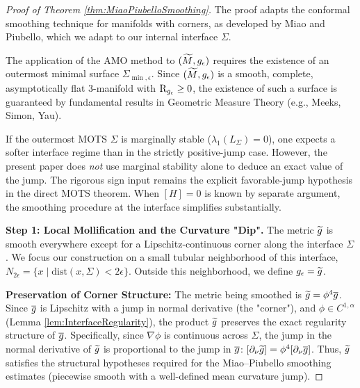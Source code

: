 \begin{proof}[Proof of Theorem \ref{thm:MiaoPiubelloSmoothing}]
The proof adapts the conformal smoothing technique for manifolds with corners, as developed by Miao and Piubello, which we adapt to our internal interface $\Sigma$.

\begin{remark}
The application of the AMO method to $(\widetilde{M}, g_{\epsilon})$ requires the existence of an outermost minimal surface $\Sigma_{\min, \epsilon}$. Since $(\widetilde{M}, g_{\epsilon})$ is a smooth, complete, asymptotically flat 3-manifold with $\mathrm{R}_{g_{\epsilon}}\ge 0$, the existence of such a surface is guaranteed by fundamental results in Geometric Measure Theory (e.g., Meeks, Simon, Yau).
\end{remark}

\begin{remark}
If the outermost MOTS $\Sigma$ is marginally stable ($\lambda_1(L_\Sigma)=0$), one expects a softer interface regime than in the strictly positive-jump case. However, the present paper does \emph{not} use marginal stability alone to deduce an exact value of the jump. The rigorous sign input remains the explicit favorable-jump hypothesis in the direct MOTS theorem. When $[H]=0$ is known by separate argument, the smoothing procedure at the interface simplifies substantially.
\end{remark}

\textbf{Step 1: Local Mollification and the Curvature "Dip".}
The metric $\widetilde{g}$ is smooth everywhere except for a Lipschitz-continuous corner along the interface $\Sigma$. We focus our construction on a small tubular neighborhood of this interface, $N_{2\epsilon} = \{x \mid \text{dist}(x, \Sigma) < 2\epsilon\}$. Outside this neighborhood, we define $g_{\epsilon} = \widetilde{g}$.

\textbf{Preservation of Corner Structure:}
The metric being smoothed is $\widetilde{g} = \phi^4 \overline{g}$. Since $\overline{g}$ is Lipschitz with a jump in normal derivative (the "corner"), and $\phi \in C^{1,\alpha}$ (Lemma \ref{lem:InterfaceRegularity}), the product $\widetilde{g}$ preserves the exact regularity structure of $\overline{g}$.
Specifically, since $\nabla \phi$ is continuous across $\Sigma$, the jump in the normal derivative of $\widetilde{g}$ is proportional to the jump in $\overline{g}$: $[\partial_\nu \widetilde{g}] = \phi^4 [\partial_\nu \overline{g}]$.
Thus, $\widetilde{g}$ satisfies the structural hypotheses required for the Miao--Piubello smoothing estimates (piecewise smooth with a well-defined mean curvature jump).


\end{proof}
